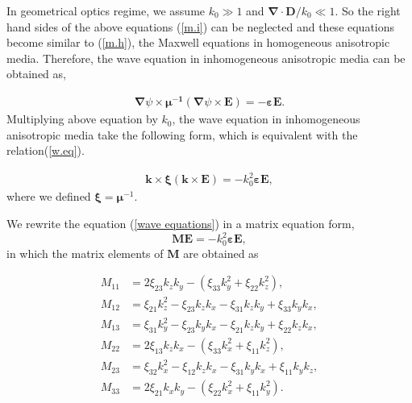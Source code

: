 \documentclass[9pt,twocolumn,twoside]{osajnl}
\begin{document}
In geometrical optics regime, we assume $k_{0}\gg1$ and $\boldsymbol{\nabla}\cdot \mathbf{D}/k_{0}\ll 1$. So the right hand  sides of the above equations (\ref{m.i}) can be neglected  and these equations become similar to (\ref{m.h}), the Maxwell equations in homogeneous anisotropic media. Therefore, the wave equation in inhomogeneous anisotropic media can be obtained as, 

\begin{eqnarray}
\boldsymbol{\nabla}{\psi}\times{\boldsymbol{\mu^{-1}}(\boldsymbol{\nabla}{\psi}\times\mathbf{E})}=-\boldsymbol{\varepsilon}\mathbf{E}.
\end{eqnarray}
Multiplying above equation by $k_{0}$, the wave equation in inhomogeneous anisotropic media take the following form, which is equivalent with the relation(\ref{w.eq}).

\begin{eqnarray}\label{wave equations}
\mathbf{k} \times{\boldsymbol{\xi}(\mathbf{k}\times\mathbf{E})}=-k^{2}_{0}\boldsymbol{\varepsilon}\mathbf{E},
\end{eqnarray}
where we defined $\boldsymbol{\xi}=\boldsymbol{\mu}^{-1}$.

We rewrite the equation (\ref{wave equations}) in a matrix equation form, 
\[\mathbf{M}\mathbf{E}=-k_{0}^{2}\boldsymbol{\varepsilon}\mathbf{E}, \] 
in which  the matrix elements of $\mathbf{M}$ are obtained as

\begin{align}
M_{11}&=2\xi_{23}k_{z}k_{y}-(\xi_{33}k_{y}^{2}+\xi_{22}k_{z}^{2}), \nonumber\\
M_{12}&=\xi_{21}k_{z}^{2}-\xi_{23}k_{z}k_{x}-\xi_{31}k_{z}k_{y}+\xi_{33}k_{y}k_{x}, \nonumber\\
M_{13}&=\xi_{31}k_{y}^{2}-\xi_{23}k_{y}k_{x}-\xi_{21}k_{z}k_{y}+\xi_{22}k_{z}k_{x}, \nonumber\\
M_{22}&=2\xi_{13}k_{z}k_{x}-(\xi_{33}k_{x}^{2}+\xi_{11}k_{z}^{2}), \nonumber\\
M_{23}&=\xi_{32}k_{x}^{2}-\xi_{12}k_{z}k_{x}-\xi_{31}k_{y}k_{x}+\xi_{11}k_{y}k_{z},\nonumber\\
M_{33}&=2\xi_{21}k_{x}k_{y}-(\xi_{22}k_{x}^{2}+\xi_{11}k_{y}^{2}).
\end{align}
\end{document}
